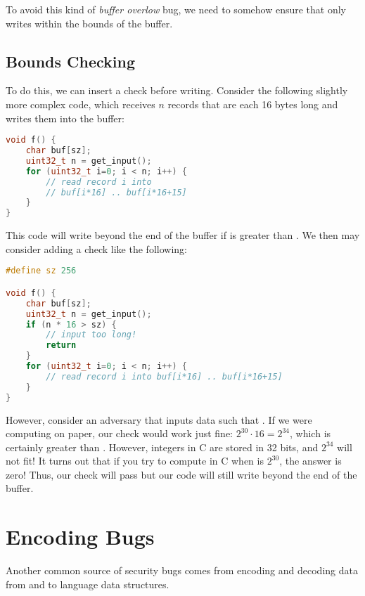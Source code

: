 
To avoid this kind of \emph{buffer overlow} bug, we need to somehow ensure that
 only writes within the bounds of the buffer. 

\subsection{Bounds Checking}
To do this, we can insert a check before writing. Consider the following slightly more complex code, which receives $n$ records that are each 16 bytes long and writes them into the buffer:

\begin{lstlisting}[language=c]
void f() {
	char buf[sz];
	uint32_t n = get_input();
	for (uint32_t i=0; i < n; i++) {
		// read record i into 
		// buf[i*16] .. buf[i*16+15]
	}
}
\end{lstlisting}

This code will write beyond the end of the buffer if  is greater than . We then may consider adding a check like the following:
\begin{lstlisting}[language=c]
#define sz 256

void f() {
	char buf[sz];
	uint32_t n = get_input();
	if (n * 16 > sz) {
		// input too long!
		return
	}
	for (uint32_t i=0; i < n; i++) {
		// read record i into buf[i*16] .. buf[i*16+15]
	}
}
\end{lstlisting}

However, consider an adversary that inputs data such that . If we
were computing on paper, our check would work just fine: $2^{30} \cdot 16 = 2^34$,
which is certainly greater than . However, integers in C are stored in
32 bits, and $2^{34}$ will not fit! It turns out that if you try to compute
 in C when  is $2^{30}$, the answer is zero! Thus, our check
will pass but our code will still write beyond the end of the buffer. 


\section{Encoding Bugs}
Another common source of security bugs comes from encoding and decoding data from and to language data structures.

